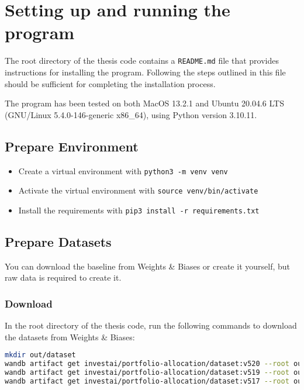 \documentclass[../xlapes02]{subfiles}
\begin{document}
    \chapter{Setting up and running the program}
    The root directory of the thesis code contains a \texttt{README.md} file that provides instructions for installing the program. Following the steps outlined in this file should be sufficient for completing the installation process.

    The program has been tested on both MacOS 13.2.1 and Ubuntu 20.04.6 LTS (GNU/Linux 5.4.0-146-generic x86\_64), using Python version 3.10.11.


    \section{Prepare Environment}
    \begin{itemize}
        \item Create a virtual environment with \texttt{python3 -m venv venv}
        \item Activate the virtual environment with \texttt{source venv/bin/activate}
        \item Install the requirements with \texttt{pip3 install -r requirements.txt}
    \end{itemize}


    \section{Prepare Datasets}
    You can download the baseline from Weights \& Biases or create it yourself, but raw data is required to create it.

    \subsection{Download}
    In the root directory of the thesis code, run the following commands to download the datasets from Weights \& Biases:
    \begin{lstlisting}[language=bash]
mkdir out/dataset
wandb artifact get investai/portfolio-allocation/dataset:v520 --root out/dataset
wandb artifact get investai/portfolio-allocation/dataset:v519 --root out/dataset
wandb artifact get investai/portfolio-allocation/dataset:v517 --root out/dataset
    \end{lstlisting}
\end{document}
